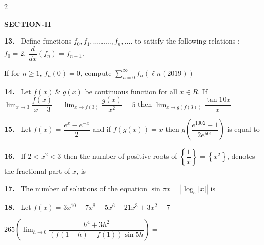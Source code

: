 \documentclass[10pt]{extarticle}
\newcommand{\sect}[1]{\par\smallskip\noindent\textbf{#1}\par}
\newcommand{\qn}[1]{\par\smallskip\noindent\textbf{#1.}~}
\begin{document}
\begin{multicols}{2}
\sect{SECTION-II}
\qn{13} Define functions $f_0,f_1,\ldots\ldots\ldots,f_n,\ldots.$ to satisfy the following relations : $f_0=2,\ \dfrac{d}{dx}\left(f_n\right)=f_{n-1}$.\par
If for $n\ge1$, $f_n(0)=0$, compute $\displaystyle\sum_{n=0}^{\infty}f_n\left(\ell n(2019)\right)$
\qn{14} Let $f(x)\ \&\ g(x)$ be continuous function for all $x\in R$. If $\displaystyle\lim_{x\to3}\dfrac{f(x)}{x-3}=\lim_{x\to f(3)}\dfrac{g(x)}{x^2}=5$ then $\displaystyle\lim_{x\to g(f(3))}\dfrac{\tan10x}{x}=$
\qn{15} Let $f(x)=\dfrac{e^x-e^{-x}}2$ and if $f(g(x))=x$ then $g\left(\dfrac{e^{1002}-1}{2e^{501}}\right)$ is equal to
\qn{16} If $2<x^2<3$ then the number of positive roots of $\left\{\dfrac1x\right\}=\left\{x^2\right\}$, denotes the fractional part of $x$, is
\qn{17} The number of solutions of the equation $\sin\pi x=\left|\log_e|x|\right|$ is
\qn{18} Let $f(x)=3x^{10}-7x^8+5x^6-21x^3+3x^2-7$\par
$265\left(\displaystyle\lim_{h\to0}\dfrac{h^4+3h^2}{\left(f(1-h)-f(1)\right)\sin5h}\right)=$
\end{multicols}
\end{document}

